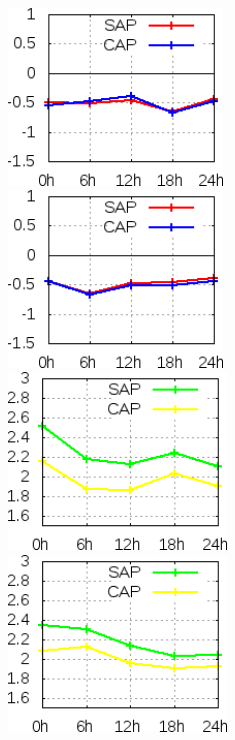 \begin{figure}[!hbp]
\centering
\includegraphics[height=4.7cm]{./figs/VIES850temp0Z.png}\vspace{1.0cm}\hspace{1.0cm}\includegraphics[height=4.7cm]{./figs/VIES850temp12Z.png}
\includegraphics[height=4.7cm]{./figs/EQM850temp0Z.png}\vspace{1.0cm}\hspace{1.0cm}\includegraphics[height=4.7cm]{./figs/EQM850temp12Z.png}

\end{figure}
